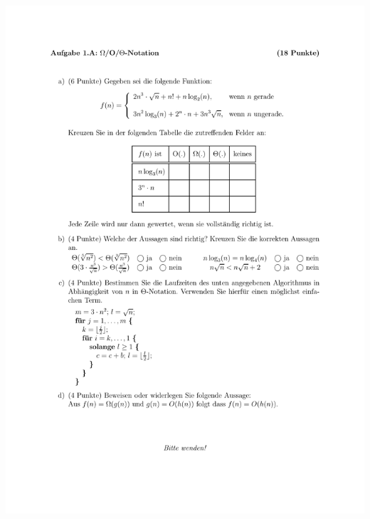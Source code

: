 \documentclass[a4paper, 12pt]{article}
\begin{document}
\begin{minipage}[t]{0.45\textwidth}
    \centering
    \includegraphics{Figures/Test_2007-11-16_1Ac}
    \label{figure:Test_2007-11-16_1Ac}
\end{minipage}
\begin{minipage}[t]{0.08\textwidth}~\end{minipage}
\end{document}

